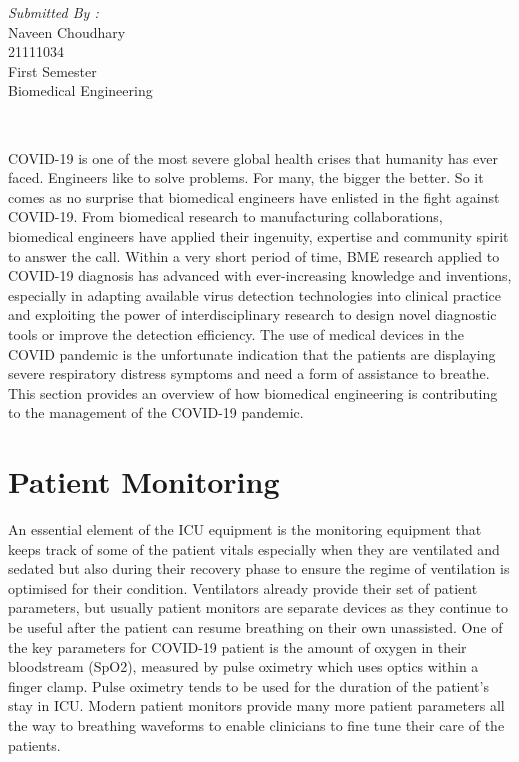 \documentclass[12pt]{article}
\begin{document}
\begin{titlepage}
\begin{minipage}{0.4\textwidth}
			\begin{flushright} \large
			\emph{Submitted By :} \\
			Naveen Choudhary\\
            21111034\\
        First Semester\\
        Biomedical Engineering\\
		\end{flushright}
        
	\end{minipage}\\[2 cm]
	

\end{titlepage}

\newpage

COVID-19 is one of the most severe global health crises that humanity has ever faced. Engineers like to solve problems. For many, the bigger the better. So it comes as no surprise that biomedical engineers have enlisted in the fight against COVID-19. From biomedical research to manufacturing collaborations, biomedical engineers have applied their ingenuity, expertise and community spirit to answer the call. Within a very short period of time, BME research applied to COVID-19 diagnosis has advanced with ever-increasing knowledge and inventions, especially in adapting available virus detection technologies into clinical practice and exploiting the power of interdisciplinary research to design novel diagnostic tools or improve the detection efficiency. The use of medical devices in the COVID pandemic is the unfortunate indication that the patients are displaying severe respiratory distress symptoms and need a form of assistance to breathe. This section provides an overview of how biomedical engineering is contributing to the management of the COVID-19 pandemic.
 
 \section{Patient Monitoring}
 
 An essential element of the ICU equipment is the monitoring equipment that keeps track of some of the patient vitals especially when they are ventilated and sedated but also during their recovery phase to ensure the regime of ventilation is optimised for their condition. Ventilators already provide their set of patient parameters, but usually patient monitors are separate devices as they continue to be useful after the patient can resume breathing on their own unassisted. One of the key parameters for COVID-19 patient is the amount of oxygen in their bloodstream (SpO2), measured by pulse oximetry which uses optics within a finger clamp. Pulse oximetry tends to be used for the duration of the patient’s stay in ICU. Modern patient monitors provide many more patient parameters all the way to breathing waveforms to enable clinicians to fine tune their care of the patients.
 
\end{document}
